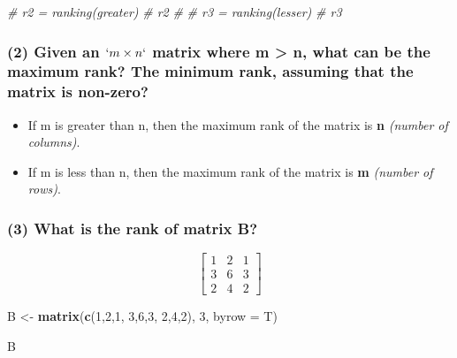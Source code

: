 \documentclass[]{article}
\newenvironment{Shaded}{\begin{snugshade}}{\end{snugshade}}
\newcommand{\CommentTok}[1]{\textcolor[rgb]{0.56,0.35,0.01}{\textit{#1}}}
\newcommand{\DataTypeTok}[1]{\textcolor[rgb]{0.13,0.29,0.53}{#1}}
\newcommand{\DecValTok}[1]{\textcolor[rgb]{0.00,0.00,0.81}{#1}}
\newcommand{\KeywordTok}[1]{\textcolor[rgb]{0.13,0.29,0.53}{\textbf{#1}}}
\newcommand{\NormalTok}[1]{#1}
\newcommand{\StringTok}[1]{\textcolor[rgb]{0.31,0.60,0.02}{#1}}
\begin{document}
\begin{Shaded}
\begin{Highlighting}[]
\CommentTok{# r2 = ranking(greater)}
\CommentTok{# r2}
\CommentTok{# }
\CommentTok{# r3 = ranking(lesser)}
\CommentTok{# r3}
\end{Highlighting}
\end{Shaded}

\hypertarget{given-an-mtimes-n-matrix-where-m-n-what-can-be-the-maximum-rank-the-minimum-rank-assuming-that-the-matrix-is-non-zero}{%
\subsubsection{\texorpdfstring{(2) Given an \(`m\times n`\) matrix where
m \textgreater{} n, what can be the maximum rank? The minimum rank,
assuming that the matrix is
non-zero?}{(2) Given an `m\textbackslash times n` matrix where m \textgreater{} n, what can be the maximum rank? The minimum rank, assuming that the matrix is non-zero?}}\label{given-an-mtimes-n-matrix-where-m-n-what-can-be-the-maximum-rank-the-minimum-rank-assuming-that-the-matrix-is-non-zero}}

\begin{itemize}
\item
  If m is greater than n, then the maximum rank of the matrix is
  \textbf{n} \emph{(number of columns)}.
\item
  If m is less than n, then the maximum rank of the matrix is \textbf{m}
  \emph{(number of rows)}.
\end{itemize}

\hypertarget{what-is-the-rank-of-matrix-b}{%
\subsubsection{(3) What is the rank of matrix
B?}\label{what-is-the-rank-of-matrix-b}}

\[\begin{bmatrix} 1 & 2 & 1 \\ 3 & 6 & 3 \\ 2 & 4 & 2 \end{bmatrix}\]

\begin{Shaded}
\begin{Highlighting}[]
\NormalTok{B <-}\StringTok{ }\KeywordTok{matrix}\NormalTok{(}\KeywordTok{c}\NormalTok{(}\DecValTok{1}\NormalTok{,}\DecValTok{2}\NormalTok{,}\DecValTok{1}\NormalTok{,}
              \DecValTok{3}\NormalTok{,}\DecValTok{6}\NormalTok{,}\DecValTok{3}\NormalTok{,}
              \DecValTok{2}\NormalTok{,}\DecValTok{4}\NormalTok{,}\DecValTok{2}\NormalTok{), }\DecValTok{3}\NormalTok{, }\DataTypeTok{byrow =}\NormalTok{ T)}

\NormalTok{B}
\end{Highlighting}
\end{Shaded}
\end{document}
